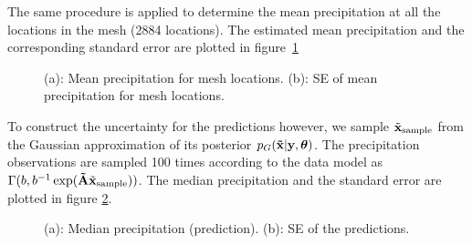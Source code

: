 \documentclass[a4paper,10pt]{article}
\def\btA{{\bf \tilde A}}
\def\bx{{\bf x}}
\def\by{{\bf y}}
\def\btx{{\bf{\tilde x}}}
\def\btheta{{\boldsymbol \theta}}
\def\txsample{{\tilde \bx_{\mathrm{sample}}}}
\begin{document}
The same procedure is applied to determine the mean precipitation at all the locations in the mesh (2884 locations). The estimated mean precipitation and the corresponding standard error are plotted in figure~\ref{fig:mesh}
\begin{figure}[H]
\centering
  \qquad
  \caption{(a): Mean precipitation for mesh locations. (b): SE of mean precipitation for mesh locations.}
\label{fig:mesh}
\end{figure}

To construct the uncertainty for the predictions however, we sample $\txsample$ from the Gaussian approximation of its posterior $p_G(\btx|\by, \btheta)$. The precipitation observations are sampled 100 times according to the data model as $\Gamma(b, b^{-1} \exp(\btA \txsample))$. The median precipitation and the standard error are plotted in figure \ref{fig:meshpred}.
\begin{figure}[H]
\centering
  \qquad
  \caption{(a): Median precipitation (prediction). (b): SE of the predictions.}
\label{fig:meshpred}
\end{figure}
\end{document}
